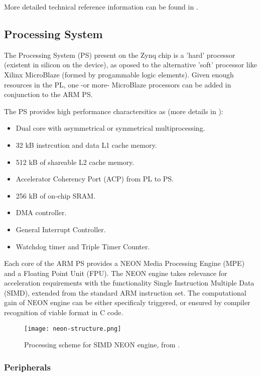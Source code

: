 More detailed technical reference information can be found in \cite[p.~30]{UG585}.

\subsection{Processing System}

The Processing System (PS) present on the Zynq chip is a 'hard' processor (existent in silicon on
the device), as oposed to the alternative 'soft' processor like Xilinx MicroBlaze (formed by
progammable logic elements). Given enough resources in the PL, one -or more- MicroBlaze processors
can be added in conjunction to the ARM PS. 

The PS provides high performance charactersitics as (more details in \cite[p.~32]{UG585}):
\begin{itemize}
	\item Dual core with asymmetrical or symmetrical multiprocessing.
	\item 32 kB instrcution and data L1 cache memory.
	\item 512 kB of shareable L2 cache memory.
	\item Accelerator Coherency Port (ACP) from PL to PS.
	\item 256 kB of on-chip SRAM.
	\item DMA controller.
	\item General Interrupt Controller.
	\item Watchdog timer and Triple Timer Counter.
\end{itemize}

Each core of the ARM PS provides a NEON Media Processing Engine (MPE) and a Floating Point Unit
(FPU). The NEON engine takes relevance for acceleration requirements with the functionality Single
Instruction Multiple Data (SIMD), extended from the standard ARM instruction set. The computational
gain of NEON engine can be either specificaly triggered, or ensured by compiler recognition of
viable format in C code.

\begin{figure}[htp]
	\centering
	\texttt{[image: neon-structure.png]}
	\caption{Processing scheme for SIMD NEON engine, from \cite{Crokett2014}.}
	\label{fig:neon-structure}
\end{figure}

\subsubsection{Peripherals}

